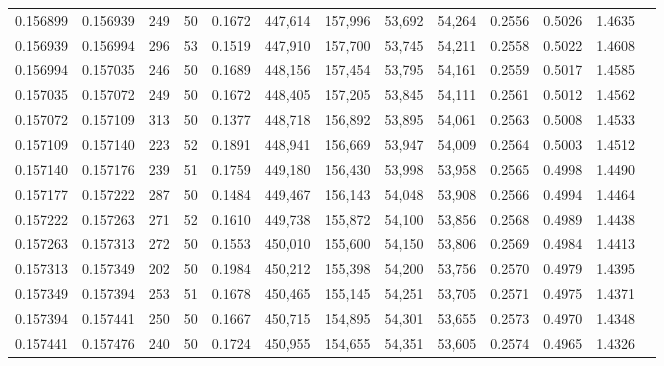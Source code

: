 \begin{tabular}{rrrrrrrrrrrrr}
0.156899 & 0.156939 &   249 &  50 &                                     0.1672 & 447,614 & 157,996 &  53,692 &  54,264 & 0.2556 & 0.5026 & 1.4635 \\
0.156939 & 0.156994 &   296 &  53 &                                     0.1519 & 447,910 & 157,700 &  53,745 &  54,211 & 0.2558 & 0.5022 & 1.4608 \\
0.156994 & 0.157035 &   246 &  50 &                                     0.1689 & 448,156 & 157,454 &  53,795 &  54,161 & 0.2559 & 0.5017 & 1.4585 \\
0.157035 & 0.157072 &   249 &  50 &                                     0.1672 & 448,405 & 157,205 &  53,845 &  54,111 & 0.2561 & 0.5012 & 1.4562 \\
0.157072 & 0.157109 &   313 &  50 &                                     0.1377 & 448,718 & 156,892 &  53,895 &  54,061 & 0.2563 & 0.5008 & 1.4533 \\
0.157109 & 0.157140 &   223 &  52 &                                     0.1891 & 448,941 & 156,669 &  53,947 &  54,009 & 0.2564 & 0.5003 & 1.4512 \\
0.157140 & 0.157176 &   239 &  51 &                                     0.1759 & 449,180 & 156,430 &  53,998 &  53,958 & 0.2565 & 0.4998 & 1.4490 \\
0.157177 & 0.157222 &   287 &  50 &                                     0.1484 & 449,467 & 156,143 &  54,048 &  53,908 & 0.2566 & 0.4994 & 1.4464 \\
0.157222 & 0.157263 &   271 &  52 &                                     0.1610 & 449,738 & 155,872 &  54,100 &  53,856 & 0.2568 & 0.4989 & 1.4438 \\
0.157263 & 0.157313 &   272 &  50 &                                     0.1553 & 450,010 & 155,600 &  54,150 &  53,806 & 0.2569 & 0.4984 & 1.4413 \\
0.157313 & 0.157349 &   202 &  50 &                                     0.1984 & 450,212 & 155,398 &  54,200 &  53,756 & 0.2570 & 0.4979 & 1.4395 \\
0.157349 & 0.157394 &   253 &  51 &                                     0.1678 & 450,465 & 155,145 &  54,251 &  53,705 & 0.2571 & 0.4975 & 1.4371 \\
0.157394 & 0.157441 &   250 &  50 &                                     0.1667 & 450,715 & 154,895 &  54,301 &  53,655 & 0.2573 & 0.4970 & 1.4348 \\
0.157441 & 0.157476 &   240 &  50 &                                     0.1724 & 450,955 & 154,655 &  54,351 &  53,605 & 0.2574 & 0.4965 & 1.4326 \\

\end{tabular}
